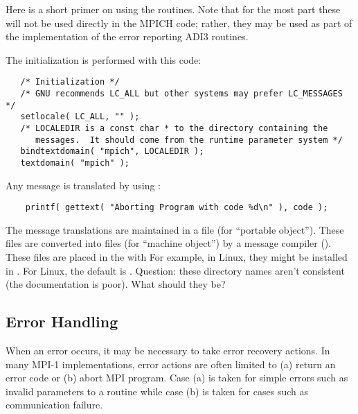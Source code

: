 \documentclass{article}
\begin{document}
Here is a short primer on using the  routines.  Note that for
the most part these will not be used directly in the MPICH code; rather, they
may be used as part of the implementation of the error reporting ADI3
routines.

The initialization is performed with this code:
\begin{verbatim}
   /* Initialization */
   /* GNU recommends LC_ALL but other systems may prefer LC_MESSAGES */
   setlocale( LC_ALL, "" );
   /* LOCALEDIR is a const char * to the directory containing the
      messages.  It should come from the runtime parameter system */
   bindtextdomain( "mpich", LOCALEDIR );
   textdomain( "mpich" );
\end{verbatim}

Any message is translated by using :
\begin{verbatim}
    printf( gettext( "Aborting Program with code %d\n" ), code );
\end{verbatim}
The message translations are maintained in a  file (for ``portable
object'').  These files are converted into  files (for ``machine
object'') by a message compiler ().  These files are placed in
the  with 
For example, in Linux, they might be installed in
.   For Linux, the default
 is .  
Question: these directory names aren't consistent (the documentation is
poor).  What should they be?

\subsection{Error Handling}
\label{sec:error-handling}

When an error occurs, it may be necessary to take error recovery
actions.  In many MPI-1 implementations, error actions are often
limited to (a) return an error code or (b) abort MPI program.
Case (a) is taken for simple errors such as invalid parameters to a
routine while case (b) is taken for cases such as communication
failure.  
\end{document}
